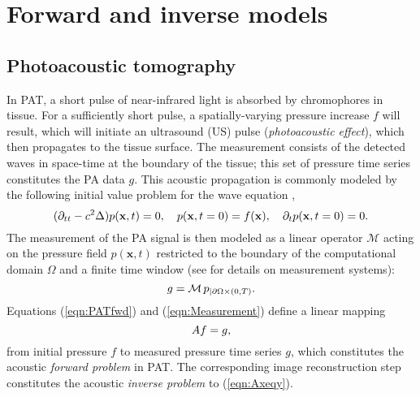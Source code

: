 \documentclass[runningheads]{llncs}
\newcommand{\bx}{\mathbf{x}}
\begin{document}
\vspace{-0.5em}

\section{Forward and inverse models}
\subsection{Photoacoustic tomography}
In PAT, a short pulse of near-infrared light is absorbed by 
chromophores in tissue. For a sufficiently short pulse, a spatially-varying pressure increase $f$ will result, which will initiate an 
ultrasound (US) pulse (\textit{photoacoustic effect}), which then propagates to the tissue surface. The measurement consists of the detected waves in space-time at the boundary of the tissue; this set of pressure time series constitutes the PA data $g$. 
This acoustic propagation is
commonly modeled by the following initial value problem for the wave equation \cite{Cox2005},
\vspace{-0.5em}
\begin{equation}
(\partial_{tt} - c^2 \Delta) p(\bx,t) = 0, \quad p(\bx,t = 0) = f(\bx), \quad \partial_t p(\bx,t = 0) = 0.\label{eqn:PATfwd}
\vspace{-0.5em}
\end{equation}
The measurement of the PA signal is then modeled as a linear operator $\mathcal{M}$ acting on the pressure field $p(\bx,t)$ restricted to the boundary of the computational domain $\Omega$ and a finite time window (see \cite{Beard:2011if,LuRa13} for details on measurement systems):
\vspace{-0.5em}
\begin{equation}
g = \mathcal{M} \, p_{|\partial \Omega \times (0,T)}. \label{eqn:Measurement}
\vspace{-0.5em}
\end{equation}
Equations (\ref{eqn:PATfwd}) and (\ref{eqn:Measurement}) define a linear mapping 
\vspace{-0.5em}
\begin{equation}
Af=g,
\label{eqn:Axeqy}
\vspace{-0.5em}
\end{equation}
from initial pressure $f$ to measured pressure time series $g$, which constitutes the acoustic \emph{forward problem} in PAT. The corresponding image reconstruction step constitutes the acoustic \emph{inverse problem} to (\ref{eqn:Axeqy}). 
\end{document}
